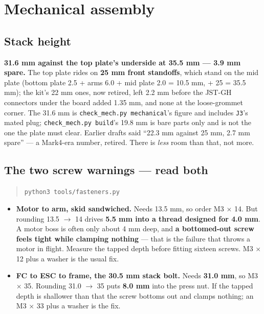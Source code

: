 \documentclass[11pt,a4paper]{article}
\newcommand{\file}[1]{\texttt{\small #1}}
\newcommand{\cmd}[1]{\texttt{\small #1}}
\newcommand{\flag}[1]{\textcolor{warnred}{\textbf{#1}}}
\begin{document}
\section{Mechanical assembly}

\subsection{Stack height}

\textbf{31.6 mm against the top plate's underside at 35.5 mm --- 3.9 mm spare.} The top
plate rides on \textbf{25 mm front standoffs}, which stand on the mid plate (bottom plate
2.5 + arms 6.0 + mid plate 2.0 = 10.5 mm, + 25 = 35.5 mm); the kit's 22 mm ones, now retired, left
2.2 mm before the JST-GH connectors under the board added 1.35 mm, and none at the
loose-grommet corner. The 31.6 mm is
\file{check\_mech.py mechanical}'s figure and includes \file{J3}'s mated plug; \file{check\_mech.py build}'s
19.8 mm is bare parts only and is not the one the plate must clear. Earlier drafts said
``22.3 mm against 25 mm, 2.7 mm spare'' --- a Mark4-era number, retired. There is
\emph{less} room than that, not more.

\subsection{The two screw warnings --- read both}
\label{sec:screws}

\begin{quote}
\cmd{python3 tools/fasteners.py}
\end{quote}

\begin{itemize}
\item \flag{Motor to arm, skid sandwiched.} Needs 13.5 mm, so order M3 $\times$ 14. But
rounding 13.5 $\rightarrow$ 14 drives \textbf{5.5 mm into a thread designed for 4.0 mm}. A
motor boss is often only about 4 mm deep, and \textbf{a bottomed-out screw feels tight
while clamping nothing} --- that is the failure that throws a motor in flight. Measure the
tapped depth before fitting sixteen screws. M3 $\times$ 12 plus a washer is the usual fix.
\item \flag{FC to ESC to frame, the 30.5 mm stack bolt.} Needs \textbf{31.0 mm}, so M3
$\times$ 35. Rounding 31.0 $\rightarrow$ 35 puts \textbf{8.0 mm} into the press nut. If the
tapped depth is shallower than that the screw bottoms out and clamps nothing; an M3 $\times$ 33
plus a washer is the fix.
\end{itemize}
\end{document}
